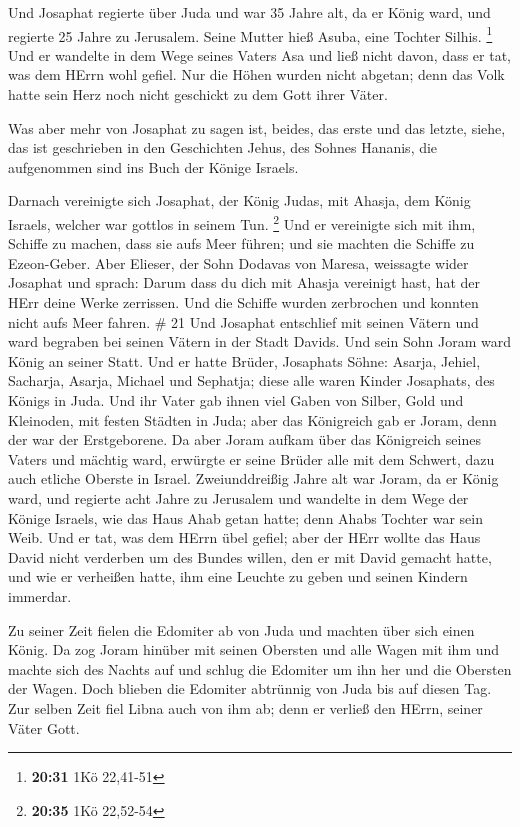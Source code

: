  Und Josaphat regierte über Juda und war 35 Jahre alt, da
er König ward, und regierte 25 Jahre zu Jerusalem. Seine Mutter hieß
Asuba, eine Tochter Silhis. \footnote{\textbf{20:31} 1Kö 22,41-51}
 Und er wandelte in dem Wege seines Vaters Asa und ließ
nicht davon, dass er tat, was dem HErrn wohl gefiel.  Nur
die Höhen wurden nicht abgetan; denn das Volk hatte sein Herz noch nicht
geschickt zu dem Gott ihrer Väter.

 Was aber mehr von Josaphat zu sagen ist, beides, das erste
und das letzte, siehe, das ist geschrieben in den Geschichten Jehus, des
Sohnes Hananis, die aufgenommen sind ins Buch der Könige Israels.

 Darnach vereinigte sich Josaphat, der König Judas, mit
Ahasja, dem König Israels, welcher war gottlos in seinem Tun.
\footnote{\textbf{20:35} 1Kö 22,52-54}  Und er vereinigte
sich mit ihm, Schiffe zu machen, dass sie aufs Meer führen; und sie
machten die Schiffe zu Ezeon-Geber.  Aber Elieser, der Sohn
Dodavas von Maresa, weissagte wider Josaphat und sprach: Darum dass du
dich mit Ahasja vereinigt hast, hat der HErr deine Werke zerrissen. Und
die Schiffe wurden zerbrochen und konnten nicht aufs Meer fahren. \# 21
 Und Josaphat entschlief mit seinen Vätern und ward begraben
bei seinen Vätern in der Stadt Davids. Und sein Sohn Joram ward König an
seiner Statt.  Und er hatte Brüder, Josaphats Söhne: Asarja,
Jehiel, Sacharja, Asarja, Michael und Sephatja; diese alle waren Kinder
Josaphats, des Königs in Juda.  Und ihr Vater gab ihnen viel
Gaben von Silber, Gold und Kleinoden, mit festen Städten in Juda; aber
das Königreich gab er Joram, denn der war der Erstgeborene. 
Da aber Joram aufkam über das Königreich seines Vaters und mächtig ward,
erwürgte er seine Brüder alle mit dem Schwert, dazu auch etliche Oberste
in Israel.  Zweiunddreißig Jahre alt war Joram, da er König
ward, und regierte acht Jahre zu Jerusalem  und wandelte in
dem Wege der Könige Israels, wie das Haus Ahab getan hatte; denn Ahabs
Tochter war sein Weib. Und er tat, was dem HErrn übel gefiel;
 aber der HErr wollte das Haus David nicht verderben um des
Bundes willen, den er mit David gemacht hatte, und wie er verheißen
hatte, ihm eine Leuchte zu geben und seinen Kindern immerdar.

 Zu seiner Zeit fielen die Edomiter ab von Juda und machten
über sich einen König.  Da zog Joram hinüber mit seinen
Obersten und alle Wagen mit ihm und machte sich des Nachts auf und
schlug die Edomiter um ihn her und die Obersten der Wagen. 
Doch blieben die Edomiter abtrünnig von Juda bis auf diesen Tag. Zur
selben Zeit fiel Libna auch von ihm ab; denn er verließ den HErrn,
seiner Väter Gott.

